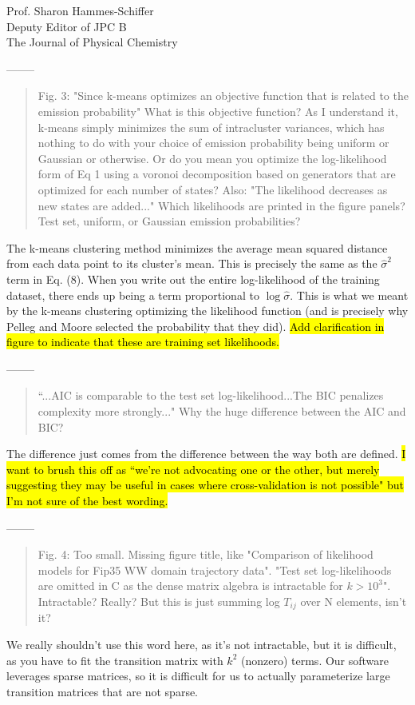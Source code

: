 \documentclass{letter}
\newcommand{\separate}{\begin{center}--------\end{center}}
\begin{document}
\begin{letter}{Prof. Sharon Hammes-Schiffer \\ Deputy Editor of JPC B \\ The Journal of Physical Chemistry}
\separate
\begin{quote}
Fig. 3: "Since k-means optimizes an objective function that is related to the emission probability" What is this objective function?  As I understand it, k-means simply minimizes the sum of intracluster variances, which has nothing to do with your choice of emission probability being uniform or Gaussian or otherwise. Or do you mean you optimize the log-likelihood form of Eq 1 using a voronoi decomposition based on generators that are optimized for each number of states?  Also: "The likelihood decreases as new states are added..."  Which likelihoods are printed in the figure panels?  Test set, uniform, or Gaussian emission probabilities?
\end{quote}

The k-means clustering method minimizes the average mean squared distance from each data point to its cluster's mean. This is precisely the same as the $\hat{\sigma}^2$ term in Eq. (8). When you write out the entire log-likelihood of the training dataset, there ends up being a term proportional to $\log \hat{\sigma}$. This is what we meant by the k-means clustering optimizing the likelihood function (and is precisely why Pelleg and Moore selected the probability that they did). \hl{Add clarification in figure to indicate that these are training set likelihoods.}

\separate
\begin{quote}
``...AIC is comparable to the test set log-likelihood...The BIC penalizes complexity more strongly..." Why the huge difference between the AIC and BIC?
\end{quote}

The difference just comes from the difference between the way both are defined. \hl{I want to brush this off as ``we're not advocating one or the other, but merely suggesting they may be useful in cases where cross-validation is not possible" but I'm not sure of the best wording.}

\separate
\begin{quote}
Fig. 4: Too small.  Missing figure title, like "Comparison of likelihood models for Fip35 WW domain trajectory data".  "Test set log-likelihoods are omitted in C as the dense matrix algebra is intractable for $k > 10^3$".  Intractable?  Really?  But this is just summing log $T_{ij}$ over N elements, isn't it?
\end{quote}
We really shouldn't use this word here, as it's not intractable, but it is difficult, as you have to fit the transition matrix with $k^2$ (nonzero) terms. Our software leverages sparse matrices, so it is difficult for us to actually parameterize large transition matrices that are not sparse.


\end{letter}
\end{document}

